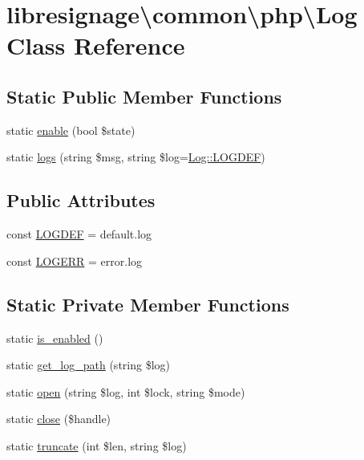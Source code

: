 \hypertarget{classlibresignage_1_1common_1_1php_1_1Log}{}\section{libresignage\textbackslash{}common\textbackslash{}php\textbackslash{}Log Class Reference}
\label{classlibresignage_1_1common_1_1php_1_1Log}
\subsection*{Static Public Member Functions}
\begin{DoxyCompactItemize}
\item 
static \hyperlink{classlibresignage_1_1common_1_1php_1_1Log_ae8b6c43bc9c7894141fc38a86ce3b2b0}{enable} (bool \$state)
\item 
static \hyperlink{classlibresignage_1_1common_1_1php_1_1Log_a8ff310f96d1553211e564f3f07cc3fa2}{logs} (string \$msg, string \$log=\hyperlink{classlibresignage_1_1common_1_1php_1_1Log_af7e8bd6a685a8bab717735b92ba5e6a6}{Log\+::\+L\+O\+G\+D\+EF})
\end{DoxyCompactItemize}
\subsection*{Public Attributes}
\begin{DoxyCompactItemize}
\item 
const \hyperlink{classlibresignage_1_1common_1_1php_1_1Log_af7e8bd6a685a8bab717735b92ba5e6a6}{L\+O\+G\+D\+EF} = \textquotesingle{}default.\+log\textquotesingle{}
\item 
const \hyperlink{classlibresignage_1_1common_1_1php_1_1Log_a336070aa9fcd03e90939473671a88525}{L\+O\+G\+E\+RR} = \textquotesingle{}error.\+log\textquotesingle{}
\end{DoxyCompactItemize}
\subsection*{Static Private Member Functions}
\begin{DoxyCompactItemize}
\item 
static \hyperlink{classlibresignage_1_1common_1_1php_1_1Log_ab8b7a79f1be86c64179d8955818c07a1}{is\+\_\+enabled} ()
\item 
static \hyperlink{classlibresignage_1_1common_1_1php_1_1Log_a849cd97efe32dd6ded634f582ed81147}{get\+\_\+log\+\_\+path} (string \$log)
\item 
static \hyperlink{classlibresignage_1_1common_1_1php_1_1Log_af1f032fc8fa3cdc2056874efb678e3a9}{open} (string \$log, int \$lock, string \$mode)
\item 
static \hyperlink{classlibresignage_1_1common_1_1php_1_1Log_aab185cd7791186337b745fa92b1e365d}{close} (\$handle)
\item 
static \hyperlink{classlibresignage_1_1common_1_1php_1_1Log_a32f3a4c23712bb05b94003d589106085}{truncate} (int \$len, string \$log)
\end{DoxyCompactItemize}


